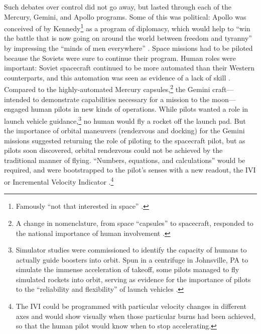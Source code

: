 Such debates over control did not go away, but lasted through each
of the Mercury, Gemini, and Apollo programs. Some of this was
political: Apollo was
conceived of by Kennedy\footnote{Famously ``not that interested in
space'' \cite{KennedyNov21}.} as a program of diplomacy,
which would help to ``win the battle that is now going on around the
world between freedom and tyranny'' by impressing the ``minds of men
everywhere'' \cite{KennedyMay25}. Space missions had to be piloted
because the Soviets were sure to continue their program. Human
roles were important: Soviet spacecraft continued to be
more automated than their Western counterparts, and
this automation was seen as evidence of a lack of skill \cite[p.
  90]{DM}.
Compared to the highly-automated Mercury capsules,\footnote{A change in nomenclature,
  from space ``capsules'' to spacecraft, responded to the national
  importance of human involvement \cite[p. 85]{kauffman}.} the Gemini
craft---intended to demonstrate capabilities necessary 
for a mission to the moon---engaged human pilots in new kinds of
operations. While pilots wanted a role in launch vehicle
guidance,\footnote{Simulator studies were commissioned to identify the
  capacity of humans to 
actually guide boosters into orbit. Spun in a
centrifuge in Johnsville, PA to simulate the immense acceleration of
takeoff, some pilots managed to fly
simulated rockets into orbit, serving as evidence for the importance of
pilots to the ``reliability and flexibility'' of launch vehicles
\cite[p. 72]{DM}.} no 
human would fly a rocket off the launch pad. But the importance of orbital maneuvers
 (rendezvous and docking) for the Gemini missions suggested returning
the role of piloting to the spacecraft pilot, but as
pilots soon discovered, orbital
rendezvous could not be achieved by the
traditional manner of flying.
``Numbers, equations, and calculations'' would be  
required, and were bootstrapped to the pilot's senses with a new
readout, the IVI or Incremental Velocity Indicator \cite[p.
  86-87]{DM}.\footnote{The IVI could be
programmed with particular velocity changes in different axes and
would show visually when those particular burns had been achieved,
so that the human pilot would know when to stop accelerating.}



